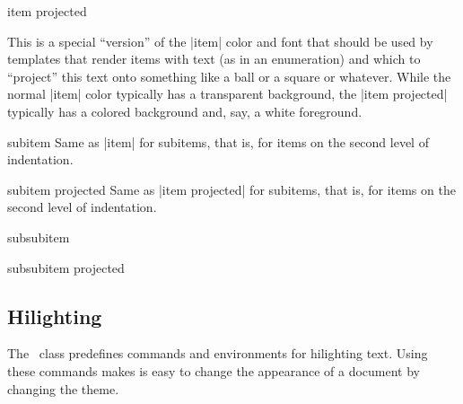 \begin{element}{item projected}\no\yes\yes

  This is a special ``version'' of the |item| color and font that
  should be used by templates that render items with text (as in an
  enumeration) and which to ``project'' this text onto something like
  a ball or a square or whatever. While the normal |item| color
  typically has a transparent background, the |item projected|
  typically has a colored background and, say, a white foreground. 
\end{element}

\begin{element}{subitem}\no\yes\yes
  Same as |item| for subitems, that is, for items on the second level of
  indentation. 
\end{element}

\begin{element}{subitem projected}\no\yes\yes
  Same as |item projected| for subitems, that is, for items on the
  second level of indentation. 
\end{element}

\begin{element}{subsubitem}\no\yes\yes
\end{element}

\begin{element}{subsubitem projected}\no\yes\yes
\end{element}




\subsection{Hilighting}

The \beamer\ class predefines commands and environments for
hilighting text. Using these commands makes is easy to change the
appearance of a document by changing the theme. 


